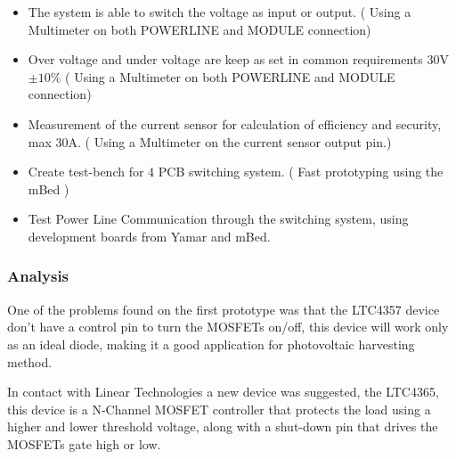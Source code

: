 \begin{itemize}
	\item The system is able to switch the voltage as input or output. ( Using a Multimeter on both POWERLINE and MODULE connection)
	\item Over voltage and under voltage are keep as set in common requirements 30V $ \pm10\% $ ( Using a Multimeter on both POWERLINE and MODULE connection)
	\item Measurement of the current sensor for calculation of efficiency and security, max 30A. ( Using a Multimeter on the current sensor output pin.)
	\item Create test-bench for 4 PCB switching system. ( Fast prototyping using the mBed )
	\item Test Power Line Communication through the switching system, using development boards from Yamar and mBed.
\end{itemize}
%
%
\subsubsection{Analysis}
%
%
%
One of the problems found on the first prototype was that the LTC4357 device don't have a control pin to turn the MOSFETs on/off, this device will work only as an ideal diode, making it a good application for photovoltaic harvesting method.

In contact with Linear Technologies a new device was suggested, the LTC4365, this device is a N-Channel MOSFET controller that protects the load using a higher and lower threshold voltage, along with a shut-down pin that drives the MOSFETs gate high or low.

